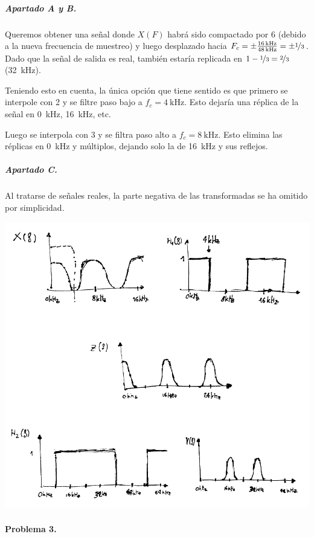 \subparagraph{Apartado A y B.}

Queremos obtener una señal donde $X(F)$ habrá sido compactado por 6 (debido
a la nueva frecuencia de muestreo) y luego desplazado hacia $F_c = \pm \frac{
\SI{16}{\kilo\hertz}}{\SI{48}{\kilo\hertz}} = \pm \nicefrac{1}{3}$. Dado que
la señal de salida es real, también estaría replicada en $1 - \nicefrac{1}{3}
= \nicefrac{2}{3}$ (\SI{32}{\kilo\hertz}).

Teniendo esto en cuenta, la única opción que tiene sentido es que primero se
interpole con 2 y se filtre paso bajo a $f_c = \SI{4}{\kilo\hertz}$. Esto
dejaría una réplica de la señal en \SI{0}{\kilo\hertz}, \SI{16}{\kilo\hertz},
etc.

Luego se interpola con 3 y se filtra paso alto a $f_c = \SI{8}{\kilo\hertz}$.
Esto elimina las réplicas en \SI{0}{\kilo\hertz} y múltiplos, dejando solo
la de \SI{16}{\kilo\hertz} y sus reflejos.

\subparagraph{Apartado C.}

Al tratarse de señales reales, la parte negativa de las transformadas se ha
omitido por simplicidad.

\includegraphics[width=\textwidth]{T7-p2c}

\finishpage
\startpage

\paragraph{Problema 3.}


